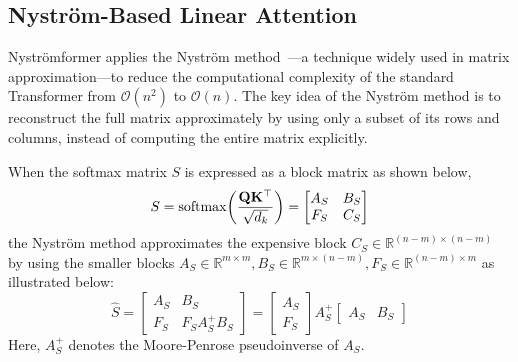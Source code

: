 \documentclass[sigconf,anonymous,review,balance=false]{acmart}
\newcommand{\rev}[1]{{\color{magenta}#1}}
\begin{document}
\subsection{Nystr\"om-Based Linear Attention}\label{subsec:nystrom-linear}
Nyströmformer applies the Nyström method~\cite{Nystromformer}—a technique widely used in matrix approximation—to reduce the computational complexity of the standard Transformer from \rev{$\mathcal{O}(n^2)$} to \rev{$\mathcal{O}(n)$}. The key idea of the Nyström method is to reconstruct the full matrix approximately by using only a subset of its rows and columns, instead of computing the entire matrix explicitly.

When the softmax matrix $S$ is expressed as a block matrix as shown below, 
\[
    S = {\mathrm{softmax}}\!\left(\frac{{\mathbf{Q}}{\mathbf{K}}^\top}{\sqrt{d_k}}\right) = \begin{bmatrix} A_S & B_S \\ F_S & C_S \end{bmatrix}
\]
the \rev{Nystr\"om} method approximates the expensive block $C_S \in \mathbb{R}^{(n-m)\times (n-m)}$ by using the smaller blocks $A_S \in \mathbb{R}^{m \times m}, B_S \in \mathbb{R}^{m \times (n-m)}, F_S \in \mathbb{R}^{(n-m)\times m}$ as illustrated below:
\[
    \hat S = \begin{bmatrix}
            A_S & B_S \\
            F_S & F_S A_S^{+} B_S
            \end{bmatrix} =
            \begin{bmatrix}
            A_S \\
            F_S
            \end{bmatrix}
            A_S^{+}
            \begin{bmatrix}
            A_S & B_S
            \end{bmatrix}
\]
Here, $A_S^+$ denotes the Moore-Penrose pseudoinverse of $A_S$.
\end{document}
